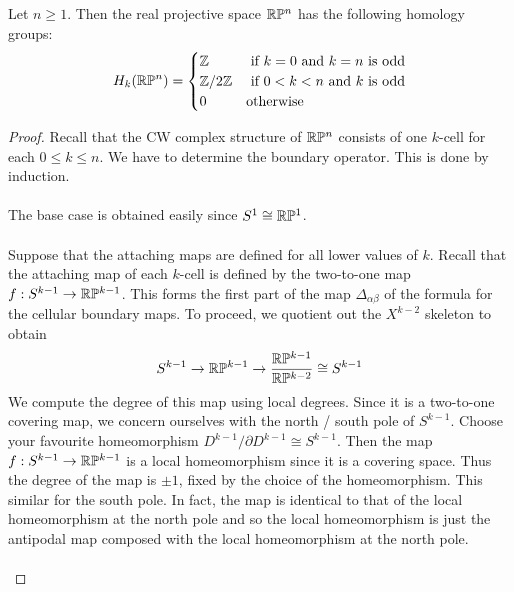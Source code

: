 \documentclass[a4paper]{article}
\begin{document}
\begin{thm}{}{} Let $n\geq 1$. Then the real projective space $\mathbb{R}\mathbb{P}^n$ has the following homology groups: $$H_k(\mathbb{R}\mathbb{P}^n)=\begin{cases}
\mathbb{Z} & \text{ if }k=0\text{ and }k=n\text{ is odd}\\
\mathbb{Z}/2\mathbb{Z} & \text{ if } 0<k<n\text{ and }k\text{ is odd}\\
0 & \text{otherwise}
\end{cases}$$ \tcbline
\begin{proof}
Recall that the CW complex structure of $\mathbb{R}\mathbb{P}^n$ consists of one $k$-cell for each $0\leq k\leq n$. We have to determine the boundary operator. This is done by induction. \\~\\

The base case is obtained easily since $S^1\cong\mathbb{R}\mathbb{P}^1$. \\~\\

Suppose that the attaching maps are defined for all lower values of $k$. Recall that the attaching map of each $k$-cell is defined by the two-to-one map $f:S^{k-1}\to\mathbb{R}\mathbb{P}^{k-1}$. This forms the first part of the map $\Delta_{\alpha\beta}$ of the formula for the cellular boundary maps. To proceed, we quotient out the $X^{k-2}$ skeleton to obtain $$S^{k-1}\to\mathbb{R}\mathbb{P}^{k-1}\to\frac{\mathbb{R}\mathbb{P}^{k-1}}{\mathbb{R}\mathbb{P}^{k-2}}\cong S^{k-1}$$ We compute the degree of this map using local degrees. Since it is a two-to-one covering map, we concern ourselves with the north / south pole of $S^{k-1}$. Choose your favourite homeomorphism $D^{k-1}/\partial D^{k-1}\cong S^{k-1}$. Then the map $f:S^{k-1}\to\mathbb{R}\mathbb{P}^{k-1}$ is a local homeomorphism since it is a covering space. Thus the degree of the map is $\pm1$, fixed by the choice of the homeomorphism. This similar for the south pole. In fact, the map is identical to that of the local homeomorphism at the north pole and so the local homeomorphism is just the antipodal map composed with the local homeomorphism at the north pole. \\~\\


\end{proof}
\end{thm}
\end{document}
